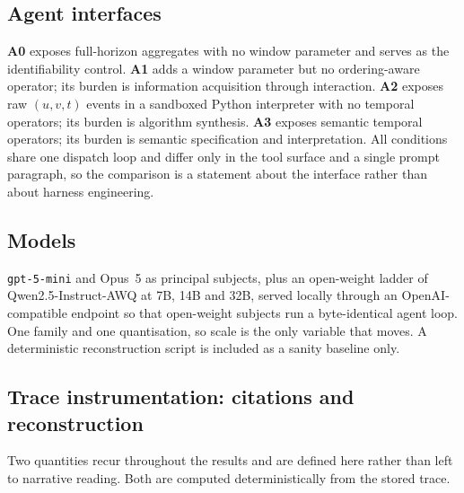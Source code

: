 \documentclass[sigconf,anonymous,review]{acmart}
\begin{document}
\subsection{Agent interfaces}
\textbf{A0} exposes full-horizon aggregates with no window parameter and serves as the
identifiability control. \textbf{A1} adds a window parameter but no ordering-aware operator; its
burden is information acquisition through interaction. \textbf{A2} exposes raw $(u,v,t)$ events in
a sandboxed Python interpreter with no temporal operators; its burden is algorithm synthesis.
\textbf{A3} exposes semantic temporal operators; its burden is semantic specification and
interpretation. All conditions share one dispatch loop and differ only in the tool surface and a
single prompt paragraph, so the comparison is a statement about the interface rather than about
harness engineering.

\subsection{Models}
\texttt{gpt-5-mini} and Opus~5 as principal subjects, plus an open-weight ladder of
Qwen2.5-Instruct-AWQ at 7B, 14B and 32B, served locally through an OpenAI-compatible endpoint so
that open-weight subjects run a byte-identical agent loop. One family and one quantisation, so
scale is the only variable that moves. A deterministic reconstruction script is included as a
sanity baseline only.

\subsection{Trace instrumentation: citations and reconstruction}
\label{sec:instr}
Two quantities recur throughout the results and are defined here rather than left to narrative
reading. Both are computed deterministically from the stored trace.
\end{document}
